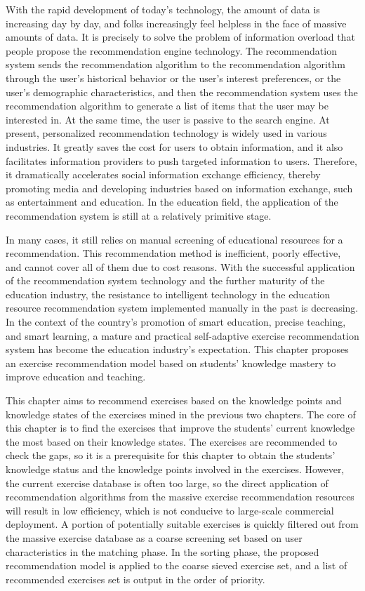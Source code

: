 With the rapid development of today's technology, the amount of data is increasing day by day, and folks increasingly feel helpless in the face of massive amounts of data. It is precisely to solve the problem of information overload that people propose the recommendation engine technology. The recommendation system sends the recommendation algorithm to the recommendation algorithm through the user's historical behavior or the user's interest preferences, or the user's demographic characteristics, and then the recommendation system uses the recommendation algorithm to generate a list of items that the user may be interested in. At the same time, the user is passive to the search engine. At present, personalized recommendation technology is widely used in various industries. It greatly saves the cost for users to obtain information, and it also facilitates information providers to push targeted information to users. Therefore, it dramatically accelerates social information exchange efficiency, thereby promoting media and developing industries based on information exchange, such as entertainment and education. In the education field, the application of the recommendation system is still at a relatively primitive stage.

In many cases, it still relies on manual screening of educational resources for a recommendation. This recommendation method is inefficient, poorly effective, and cannot cover all of them due to cost reasons. With the successful application of the recommendation system technology and the further maturity of the education industry, the resistance to intelligent technology in the education resource recommendation system implemented manually in the past is decreasing. In the context of the country's promotion of smart education, precise teaching, and smart learning, a mature and practical self-adaptive exercise recommendation system has become the education industry's expectation. This chapter proposes an exercise recommendation model based on students' knowledge mastery to improve education and teaching.

This chapter aims to recommend exercises based on the knowledge points and knowledge states of the exercises mined in the previous two chapters. The core of this chapter is to find the exercises that improve the students' current knowledge the most based on their knowledge states. The exercises are recommended to check the gaps, so it is a prerequisite for this chapter to obtain the students' knowledge status and the knowledge points involved in the exercises.  However, the current exercise database is often too large, so the direct application of recommendation algorithms from the massive exercise recommendation resources will result in low efficiency, which is not conducive to large-scale commercial deployment. A portion of potentially suitable exercises is quickly filtered out from the massive exercise database as a coarse screening set based on user characteristics in the matching phase. In the sorting phase, the proposed recommendation model is applied to the coarse sieved exercise set, and a list of recommended exercises set is output in the order of priority.

